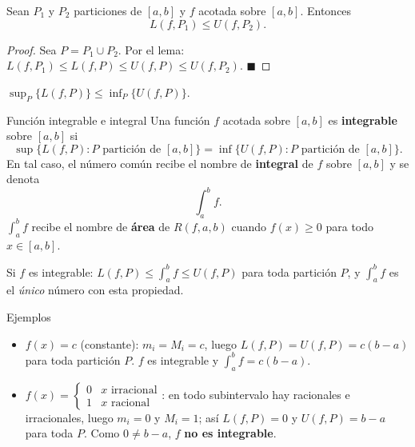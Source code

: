 \documentclass[12pt]{article}
\begin{document}
\begin{teorema}[1]{}
Sean $P_1$ y $P_2$ particiones de $[a, b]$ y $f$ acotada sobre $[a, b]$. Entonces
\[ L(f, P_1) \leq U(f, P_2). \]
\end{teorema}

\begin{proof}
Sea $P = P_1 \cup P_2$. Por el lema: $L(f, P_1) \leq L(f, P) \leq U(f, P) \leq U(f, P_2)$.
$\blacksquare$
\end{proof}

\begin{corolario}[]{}
$\displaystyle\sup_P \{L(f, P)\} \leq \inf_P \{U(f, P)\}$.
\end{corolario}

\begin{definicion}[]{Función integrable e integral}
Una función $f$ acotada sobre $[a, b]$ es \textbf{integrable} sobre $[a, b]$ si
\[ \sup\{L(f, P) : P \text{ partición de } [a,b]\} = \inf\{U(f, P) : P \text{ partición de } [a,b]\}. \]
En tal caso, el número común recibe el nombre de \textbf{integral} de $f$ sobre $[a, b]$ y se denota
\[ \int_a^b f. \]
$\int_a^b f$ recibe el nombre de \textbf{área} de $R(f, a, b)$ cuando $f(x) \geq 0$ para todo $x \in [a,b]$.

Si $f$ es integrable: $L(f,P) \leq \int_a^b f \leq U(f,P)$ para toda partición $P$, y $\int_a^b f$ es el \textit{único} número con esta propiedad.
\end{definicion}

\begin{observacion}[]{Ejemplos}
\begin{itemize}
  \item $f(x) = c$ (constante): $m_i = M_i = c$, luego $L(f,P) = U(f,P) = c(b-a)$ para toda partición $P$. $f$ es integrable y $\displaystyle\int_a^b f = c(b-a)$.

  \item $f(x) = \begin{cases}0 & x \text{ irracional} \\ 1 & x \text{ racional}\end{cases}$: en todo subintervalo hay racionales e irracionales, luego $m_i = 0$ y $M_i = 1$; así $L(f,P) = 0$ y $U(f,P) = b-a$ para toda $P$. Como $0 \neq b-a$, $f$ \textbf{no es integrable}.
\end{itemize}
\end{observacion}

\end{document}
